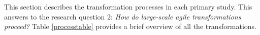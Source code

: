 This section describes the transformation processes in each primary
study. This answers to the research question 2: \textit{How do
large-scale agile transformations proceed?} Table \ref{processtable} provides a brief
overview of all the transformations.

\bigskip

\bigskip
